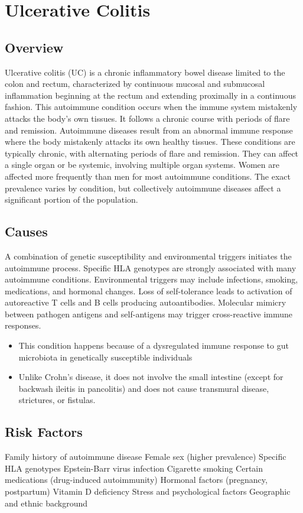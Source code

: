 \chapter{Ulcerative Colitis}
\label{sec:Ulcerative Colitis}

\section{Overview}
Ulcerative colitis (UC) is a chronic inflammatory bowel disease limited to the colon and rectum, characterized by continuous mucosal and submucosal inflammation beginning at the rectum and extending proximally in a continuous fashion. This autoimmune condition occurs when the immune system mistakenly attacks the body's own tissues. It follows a chronic course with periods of flare and remission. Autoimmune diseases result from an abnormal immune response where the body mistakenly attacks its own healthy tissues. These conditions are typically chronic, with alternating periods of flare and remission. They can affect a single organ or be systemic, involving multiple organ systems. Women are affected more frequently than men for most autoimmune conditions. The exact prevalence varies by condition, but collectively autoimmune diseases affect a significant portion of the population.
\section{Causes}
A combination of genetic susceptibility and environmental triggers initiates the autoimmune process. Specific HLA genotypes are strongly associated with many autoimmune conditions. Environmental triggers may include infections, smoking, medications, and hormonal changes. Loss of self-tolerance leads to activation of autoreactive T cells and B cells producing autoantibodies. Molecular mimicry between pathogen antigens and self-antigens may trigger cross-reactive immune responses.

\begin{itemize}[noitemsep]
  \item This condition happens because of a dysregulated immune response to gut microbiota in genetically susceptible individuals
  \item Unlike Crohn's disease, it does not involve the small intestine (except for backwash ileitis in pancolitis) and does not cause transmural disease, strictures, or fistulas.
\end{itemize}
\section{Risk Factors}
Family history of autoimmune disease Female sex (higher prevalence) Specific HLA genotypes Epstein-Barr virus infection Cigarette smoking Certain medications (drug-induced autoimmunity) Hormonal factors (pregnancy, postpartum) Vitamin D deficiency Stress and psychological factors Geographic and ethnic background

